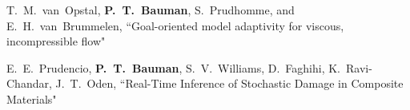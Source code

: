 T.~M.~van~Opstal, \textbf{P.~T.~Bauman}, S.~Prudhomme, and E.~H.~van~Brummelen,
``Goal-oriented model adaptivity for viscous, incompressible flow"

\blankline

E.~E.~Prudencio, \textbf{P.~T.~Bauman}, S.~V.~Williams, D.~Faghihi, K.~Ravi-Chandar,
J.~T.~Oden,
``Real-Time Inference of Stochastic Damage in Composite Materials"


